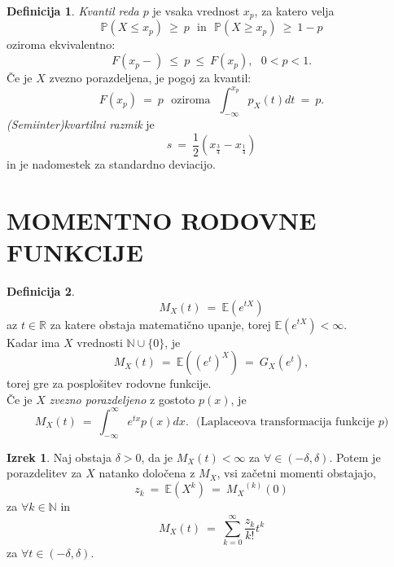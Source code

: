 \documentclass[11pt]{article}
\theoremstyle{definition}
\newtheorem{definicija}{Definicija}[section]
\theoremstyle{definition}
\theoremstyle{definition}
\newtheorem{izrek}{Izrek}[section]
\begin{document}
\begin{definicija}

\textit{Kvantil reda $p$} je vsaka vrednost $x_p$, za katero velja
$$\mathbb{P}(X \leq x_p) ~\geq~ p ~~~\text{in}~~~ \mathbb{P}(X \geq x_p) ~\geq~ 1 - p$$
oziroma ekvivalentno:
$$F(x_p-) ~\leq~ p ~\leq~ F(x_p), ~~~0 < p < 1.$$
Če je $X$ zvezno porazdeljena, je pogoj za kvantil:
$$F(x_p) ~=~ p ~~~\text{oziroma}~~~ \int_{-\infty}^{x_p} p_X(t) dt ~=~ p.$$
\textit{(Semiinter)kvartilni razmik} je
$$s ~=~ \frac{1}{2}(x_{\frac{3}{4}} - x_{\frac{1}{4}})$$
in je nadomestek za standardno deviacijo.

\end{definicija}
\vspace{0.5cm}

\pagebreak


\section{MOMENTNO RODOVNE FUNKCIJE}
\vspace{0.5cm}

\begin{definicija}

$$M_X(t) ~=~ \mathbb{E}(e^{tX})$$
az $t \in \mathbb{R}$ za katere obstaja matematično upanje, torej $\mathbb{E}(e^{tX}) < \infty$. \\

\noindent Kadar ima $X$ vrednosti $\mathbb{N} \cup \{0\}$, je
$$M_X(t) ~=~ \mathbb{E}((e^t)^X) ~=~ G_X(e^t),$$
torej gre za posplošitev rodovne funkcije. \\

\noindent Če je $X$ \textit{zvezno porazdeljeno} z gostoto $p(x)$, je
$$M_X(t) ~=~ \int_{-\infty}^{\infty} e^{tx} p(x) dx. ~~~\text{(Laplaceova transformacija funkcije $p$)}$$

\end{definicija}
\vspace{0.5cm}

\begin{izrek}

Naj obstaja $\delta > 0$, da je $M_X(t) < \infty$ za $\forall \in (-\delta, \delta)$. Potem je porazdelitev za $X$ natanko določena z $M_X$, vsi začetni momenti obstajajo,
$$z_k ~=~ \mathbb{E}(X^k) ~=~ {M_X}^{(k)}(0)$$
za $\forall k \in \mathbb{N}$ in
$$M_X(t) ~=~ \sum_{k=0}^{\infty} \frac{z_k}{k!} t^k$$
za $\forall t \in (-\delta, \delta)$.

\end{izrek}
\vspace{0.5cm}
\end{document}
